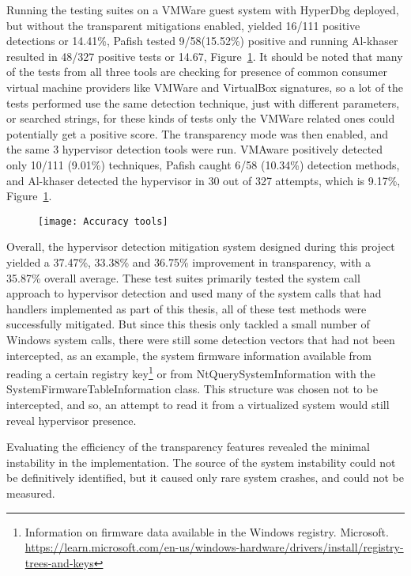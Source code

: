 Running the testing suites on a VMWare guest system with HyperDbg deployed, but without the transparent mitigations enabled, yielded 16/111 positive detections or 14.41\%, 
Pafish tested 9/58(15.52\%) positive and running Al-khaser resulted in 48/327 positive tests or 14.67, Figure~\ref{fig:test_accuracy}.
It should be noted that many of the tests from all three tools are checking for presence of common consumer virtual machine providers like VMWare and VirtualBox signatures, 
so a lot of the tests performed use the same detection technique, just with different parameters, or searched strings, for these kinds of tests only the VMWare related ones could potentially get a positive score. 
The transparency mode was then enabled, and the same 3 hypervisor detection tools were run. VMAware positively detected only 10/111 (9.01\%) techniques, Pafish caught 6/58 (10.34\%) detection methods, and 
Al-khaser detected the hypervisor in 30 out of 327 attempts, which is 9.17\%, Figure~\ref{fig:test_accuracy}.
\begin{figure}[tbh]
    \texttt{[image: Accuracy tools]} %
    \label{fig:test_accuracy}
\end{figure}

Overall, the hypervisor detection mitigation system designed during this project yielded a 37.47\%, 33.38\% and 36.75\% improvement in transparency, 
with a 35.87\% overall average. These test suites primarily tested the system call approach to hypervisor detection and used many of the system calls that had handlers implemented as part of this thesis, 
all of these test methods were successfully mitigated. But since this thesis only tackled a small number of Windows system calls, there were still some detection vectors that had not been intercepted, 
as an example, the system firmware information available from reading a certain registry key\footnote{Information on firmware data available in the Windows registry. Microsoft. \url{https://learn.microsoft.com/en-us/windows-hardware/drivers/install/registry-trees-and-keys}} 
or from NtQuerySystemInformation with the SystemFirmwareTableInformation class. This structure was chosen not to be intercepted, and so, 
an attempt to read it from a virtualized system would still reveal hypervisor presence.

Evaluating the efficiency of the transparency features revealed the minimal instability in the implementation. The source of the system instability 
could not be definitively identified, but it caused only rare system crashes, and could not be measured.


